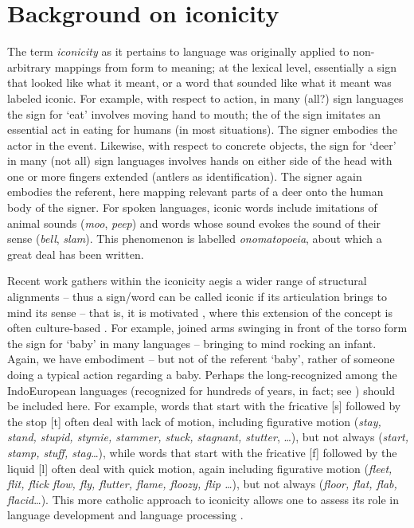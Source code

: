 \documentclass[output=paper,
modfonts
]{LSP/langsci}
\begin{document}
\section{Background on iconicity}\label{sec:napoli:2}

The term \emph{iconicity} as it pertains to language was originally
applied to non-arbitrary mappings from form to meaning; at the lexical
level, essentially a sign that looked like what it meant, or a word that
sounded like what it meant was labeled iconic. For example, with respect
to action, in many (all?) sign languages the sign for `eat' involves
moving hand to mouth; the  of the sign imitates an essential act
in eating for humans (in most situations). The signer embodies the actor
in the event. Likewise, with respect to concrete objects, the sign for
`deer' in many (not all) sign languages involves hands on either side of
the head with one or more fingers extended (antlers as identification).
The signer again embodies the referent, here mapping relevant parts of a
deer onto the human body of the signer. For spoken languages, iconic
words include imitations of animal sounds (\emph{moo}, \emph{peep}) and
words whose sound evokes the sound of their sense (\emph{bell},
\emph{slam}). This phenomenon is labelled \emph{onomatopoeia}, about
which a great deal has been written.

Recent work gathers within the iconicity aegis a wider range of
structural alignments -- thus a sign/word can be called iconic if its
articulation brings to mind its sense -- that is, it is motivated \citep{russo2004,perniss2010}, where this extension of
the concept is often culture-based \citep{adam2007}. For example,
joined arms swinging in front of the torso form the sign for `baby' in
many languages -- bringing to mind rocking an infant. Again, we have
embodiment -- but not of the referent `baby', rather of someone doing a
typical action regarding a baby. Perhaps the long-recognized
 among the IndoEuropean languages (recognized for hundreds
of years, in fact; see \citealt{drellishak2006}) should be included here. For
example, words that start with the fricative {[}s{]} followed by the
 stop {[}t{]} often deal with lack of motion, including
figurative motion (\emph{stay, stand, stupid, stymie, stammer, stuck,
stagnant, stutter}, \ldots{}), but not always (\emph{start, stamp,
stuff, stag}\ldots{}), while words that start with the fricative {[}f{]}
followed by the liquid {[}l{]} often deal with quick motion, again
including figurative motion (\emph{fleet, flit, flick flow, fly,
flutter, flame, floozy, flip \ldots{}}), but not always (\emph{floor,
flat, flab, flacid}\ldots{}). This more catholic approach to iconicity
allows one to assess its role in language development and language
processing \citep{emmorey2014,perniss2014}.
\end{document}
